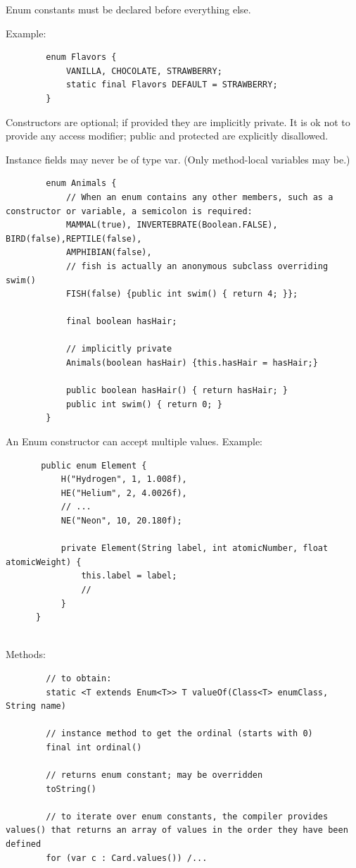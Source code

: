 \documentclass{scrartcl}
\begin{document}
    Enum constants must be declared before everything else.

    Example:

    \begin{lstlisting}
        enum Flavors {
            VANILLA, CHOCOLATE, STRAWBERRY;
            static final Flavors DEFAULT = STRAWBERRY;
        }
    \end{lstlisting}

    Constructors are optional; if provided they are implicitly private. It is ok not to provide any access modifier; public and protected are explicitly disallowed.

    Instance fields may never be of type var. (Only method-local variables may be.)

     \begin{lstlisting}
        enum Animals {
            // When an enum contains any other members, such as a constructor or variable, a semicolon is required:
            MAMMAL(true), INVERTEBRATE(Boolean.FALSE), BIRD(false),REPTILE(false),
            AMPHIBIAN(false),
            // fish is actually an anonymous subclass overriding swim()
            FISH(false) {public int swim() { return 4; }};

            final boolean hasHair;

            // implicitly private
            Animals(boolean hasHair) {this.hasHair = hasHair;}

            public boolean hasHair() { return hasHair; }
            public int swim() { return 0; }
        }

    \end{lstlisting}

    An Enum constructor can accept multiple values. Example:

    \begin{lstlisting}
       public enum Element {
           H("Hydrogen", 1, 1.008f),
           HE("Helium", 2, 4.0026f),
           // ...
           NE("Neon", 10, 20.180f);

           private Element(String label, int atomicNumber, float atomicWeight) {
               this.label = label;
               //
           }
      }


    \end{lstlisting}

    Methods:

    \begin{lstlisting}
        // to obtain:
        static <T extends Enum<T>> T valueOf(Class<T> enumClass, String name)

        // instance method to get the ordinal (starts with 0)
        final int ordinal()

        // returns enum constant; may be overridden
        toString()

        // to iterate over enum constants, the compiler provides values() that returns an array of values in the order they have been defined
        for (var c : Card.values()) /...

    \end{lstlisting}
\end{document}
